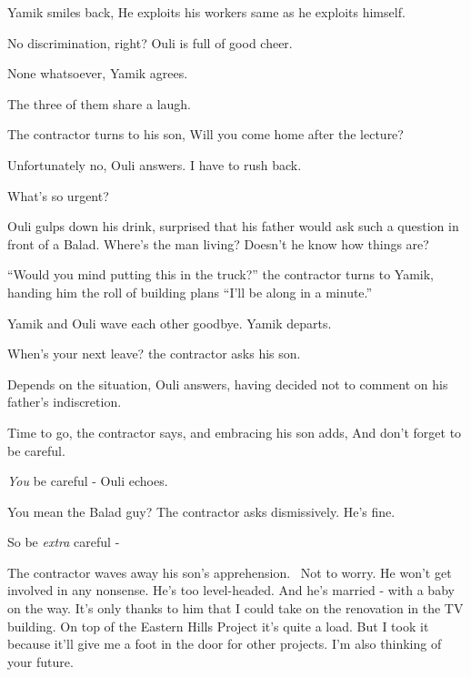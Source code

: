 \documentclass[12pt]{book}
\begin{document}
Yamik smiles back, {\textquotedbl}He exploits his workers same as he exploits himself.{\textquotedbl}

{\textquotedbl}No discrimination, right?{\textquotedbl} Ouli is full of good cheer.

{\textquotedbl}None whatsoever,{\textquotedbl} Yamik agrees.

The three of them share a laugh.

The contractor turns to his son, {\textquotedbl}Will you come home after the lecture?{\textquotedbl}

{\textquotedbl}Unfortunately no,{\textquotedbl} Ouli answers. {\textquotedbl}I have to rush back.{\textquotedbl}

{\textquotedbl}What's so urgent?{\textquotedbl}

Ouli gulps down his drink, surprised that his father would ask such a question in front of a Balad. Where's the man
living? Doesn't he know how things are? \

{}``Would you mind putting this in the truck?'' the contractor turns to Yamik, handing him the roll of building plans
``I'll be along in a minute.''

Yamik and Ouli wave each other goodbye. Yamik departs.

{\textquotedbl}When's your next leave?{\textquotedbl} the contractor asks his son.

{\textquotedbl}Depends on the situation,{\textquotedbl} Ouli answers, having decided not to comment on his father's
indiscretion.

{\textquotedbl}Time to go,{\textquotedbl} the contractor says, and embracing his son adds, {\textquotedbl}And don't
forget to be careful.{\textquotedbl}

{\textquotedbl}\textit{You} be careful -{\textquotedbl} Ouli echoes.

{\textquotedbl}You mean the Balad guy?{\textquotedbl} The contractor asks dismissively. {\textquotedbl}He's
fine.{\textquotedbl}

{\textquotedbl}So be \textit{extra} careful -{\textquotedbl}

The contractor waves away his son's apprehension.~ {\textquotedbl}Not to worry. He won't get involved in any nonsense.
He's too level-headed. And he's married - with a baby on the way. It's only thanks to him that I could take on the
renovation in the TV building. On top of the Eastern Hills Project it's quite a load. But I took it because it'll give
me a foot in the door for other projects. I'm also thinking of your future.{\textquotedbl}
\end{document}
